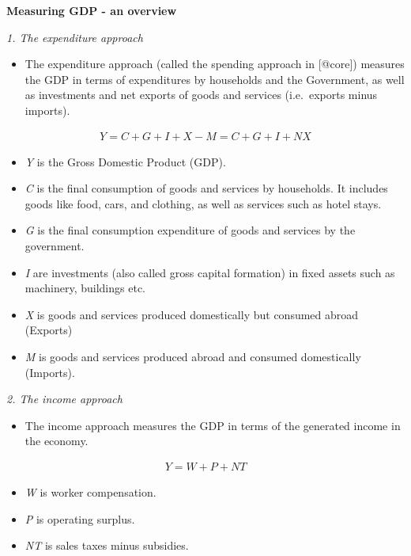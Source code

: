 \documentclass[
]{book}
\providecommand{\tightlist}{%
  \setlength{\itemsep}{0pt}\setlength{\parskip}{0pt}}
\begin{document}
\begin{myblock}
\textbf{Measuring GDP - an overview}

\emph{1. The expenditure approach}

\begin{itemize}
\tightlist
\item
  The expenditure approach (called the spending approach in {[}@core{]})
  measures the GDP in terms of expenditures by households and the
  Government, as well as investments and net exports of goods and
  services (i.e.~exports minus imports).
\end{itemize}

\begin{align}
  Y=C+G+I+X-M=C+G+I+NX
\end{align}

\begin{itemize}
\tightlist
\item
  \emph{Y} is the Gross Domestic Product (GDP).
\item
  \emph{C} is the final consumption of goods and services by households.
  It includes goods like food, cars, and clothing, as well as services
  such as hotel stays.
\item
  \emph{G} is the final consumption expenditure of goods and services by
  the government.
\item
  \emph{I} are investments (also called gross capital formation) in
  fixed assets such as machinery, buildings etc.
\item
  \emph{X} is goods and services produced domestically but consumed
  abroad (Exports)
\item
  \emph{M} is goods and services produced abroad and consumed
  domestically (Imports).
\end{itemize}

\emph{2. The income approach}

\begin{itemize}
\tightlist
\item
  The income approach measures the GDP in terms of the generated income
  in the economy.
\end{itemize}

\begin{align}
   Y=W+P+NT
\end{align}

\begin{itemize}
\tightlist
\item
  \emph{W} is worker compensation.
\item
  \emph{P} is operating surplus.
\item
  \emph{NT} is sales taxes minus subsidies.
\end{itemize}


\end{myblock}
\end{document}
